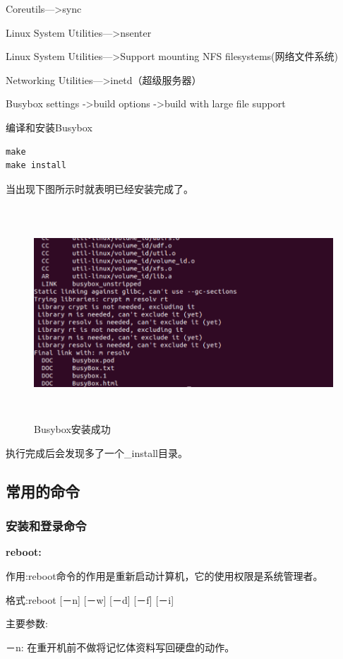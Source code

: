 Coreutils—>sync

Linux System Utilities—>nsenter

Linux System Utilities—>Support mounting NFS filesystems(网络文件系统)

Networking Utilities—>inetd（超级服务器）

Busybox settings ->build options ->build with large file support

编译和安装Busybox

\begin{lstlisting}[language=Rust]
make
make install
\end{lstlisting}

当出现下图所示时就表明已经安装完成了。

\begin{figure}[H]
\centering
\includegraphics[width=14cm,height=8cm]{figures/09-02-Busybox安装4.png}
\caption{Busybox安装成功}
\end{figure}  

执行完成后会发现多了一个\_install目录。

\subsection{常用的命令}
\subsubsection{安装和登录命令}
\textbf{reboot:}

作用:reboot命令的作用是重新启动计算机，它的使用权限是系统管理者。

格式:reboot [－n] [－w] [－d] [－f] [－i]

主要参数:

－n: 在重开机前不做将记忆体资料写回硬盘的动作。

